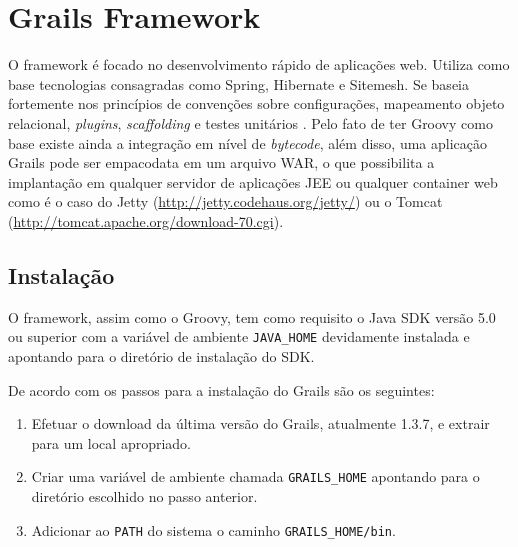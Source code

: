 \documentclass[12pt]{article}
\begin{document}
%

\section{Grails Framework}
    O framework é focado no desenvolvimento rápido de aplicações web. Utiliza como
    base tecnologias consagradas como Spring, Hibernate e Sitemesh. Se baseia 
    fortemente nos princípios de convenções sobre configurações, mapeamento objeto
    relacional, \emph{plugins}, \emph{scaffolding} e testes unitários \cite{beginingGroovy:2008}.
    Pelo fato de ter Groovy como base existe ainda a integração em nível de \emph{bytecode},
    além disso, uma aplicação Grails pode ser empacodata em um arquivo WAR, o que 
    possibilita a implantação em qualquer servidor de aplicações JEE ou qualquer
    container web como é o caso do Jetty (\url{http://jetty.codehaus.org/jetty/})
    ou o Tomcat (\url{http://tomcat.apache.org/download-70.cgi}).
    
\subsection{Instalação}
    
    O framework, assim como o Groovy, tem como requisito o Java SDK versão 5.0 ou 
    superior com a variável de ambiente \texttt{JAVA\_HOME} devidamente instalada 
    e apontando para o diretório de instalação do SDK. 
    
    De acordo com \cite{grails} os passos para a instalação do Grails são os seguintes:
    \begin{enumerate}
        \item Efetuar o download da última versão do Grails, atualmente 1.3.7, e extrair
              para um local apropriado.
        \item Criar uma variável de ambiente chamada \texttt{GRAILS\_HOME} apontando para
              o diretório escolhido no passo anterior.
        \item Adicionar ao \texttt{PATH} do sistema o caminho \texttt{GRAILS\_HOME/bin}.
    \end{enumerate}
\end{document}
